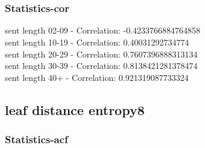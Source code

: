 \documentclass{article}%
\begin{document}
\begin{figure}[ht]%
\centering%
\setlength{\abovecaptionskip}{-35pt}%
%
%
\\%
%
%
\\%
%
\end{figure}

%
\newpage%
\subsubsection{Statistics{-}cor}%
\label{ssubsec:Statistics{-}cor}%
\noindent%
sent length 02-09 - Correlation: -0.4233766884764858\\%
sent length 10-19 - Correlation: 0.40031292734774\\%
sent length 20-29 - Correlation: 0.7607396888313134\\%
sent length 30-39 - Correlation: 0.8138421281378474\\%
sent length 40+ - Correlation: 0.921319087733324\\

%
\newpage

%
\subsection{leaf distance entropy8}%
\label{subsec:leafdistanceentropy8}%
\subsubsection{Statistics{-}acf}%
\label{ssubsec:Statistics{-}acf}%
\end{document}
